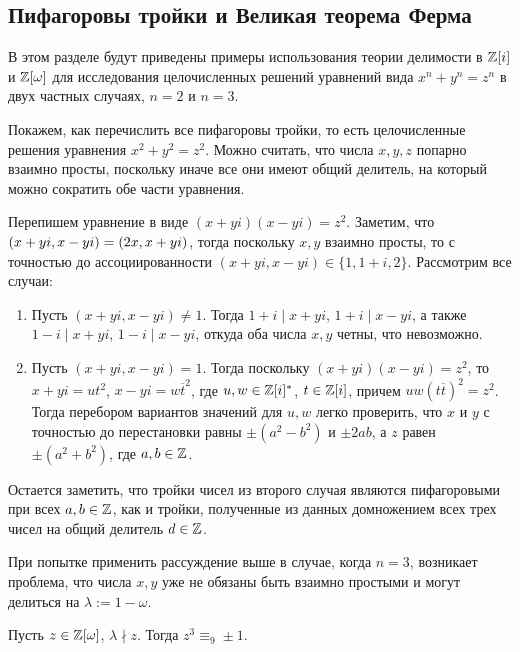 \subsection{Пифагоровы тройки и Великая теорема Ферма}

В этом разделе будут приведены примеры использования теории делимости в $\mathbb{Z}[i]$ и $\mathbb{Z}[\omega]$ для исследования целочисленных решений уравнений вида $x^n + y^n = z^n$ в двух частных случаях, $n = 2$ и $n = 3$.

\begin{example}
	Покажем, как перечислить все пифагоровы тройки, то есть целочисленные решения уравнения $x^2 + y^2 = z^2$. Можно считать, что числа $x, y, z$ попарно взаимно просты, поскольку иначе все они имеют общий делитель, на который можно сократить обе части уравнения.
	
	Перепишем уравнение в виде $(x+yi)(x-yi) = z^2$. Заметим, что $(x+yi, x-yi) \hm= (2x, x+yi)$, тогда поскольку $x, y$ взаимно просты, то с точностью до ассоциированности $(x+yi, x-yi) \in \{1, 1 + i, 2\}$. Рассмотрим все случаи:
	\begin{enumerate}
		\item Пусть $(x+yi, x-yi) \ne 1$. Тогда $1 + i \mid x + yi$, $1 + i \mid x - yi$, а также $1 - i \mid x + yi$, $1 - i \mid x - yi$, откуда оба числа $x, y$ четны, что невозможно.
		\item Пусть $(x+yi, x-yi) = 1$. Тогда поскольку $(x+yi)(x-yi) = z^2$, то $x+yi = ut^2$, $x-yi = w\overline{t}^2$, где $u, w \in \mathbb{Z}[i]^*$, $t \in \mathbb{Z}[i]$, причем $uw(t\overline{t})^2 = z^2$. Тогда перебором вариантов значений для $u, w$ легко проверить, что $x$ и $y$ с точностью до перестановки равны $\pm(a^2 - b^2)$ и $\pm2ab$, а $z$ равен $\pm(a^2 + b^2)$, где $a, b \in \mathbb{Z}$.
	\end{enumerate}

	Остается заметить, что тройки чисел из второго случая являются пифагоровыми при всех $a, b \in \mathbb{Z}$, как и тройки, полученные из данных домножением всех трех чисел на общий делитель $d \in \mathbb{Z}$.
\end{example}

\begin{note}
	При попытке применить рассуждение выше в случае, когда $n = 3$, возникает проблема, что числа $x, y$ уже не обязаны быть взаимно простыми и могут делиться на $\lambda := 1 - \omega$.
\end{note}

\begin{proposition}
	Пусть $z \in \mathbb{Z}[\omega]$, $\lambda \nmid z$. Тогда $z^3 \equiv_9 \pm1$.
\end{proposition}

